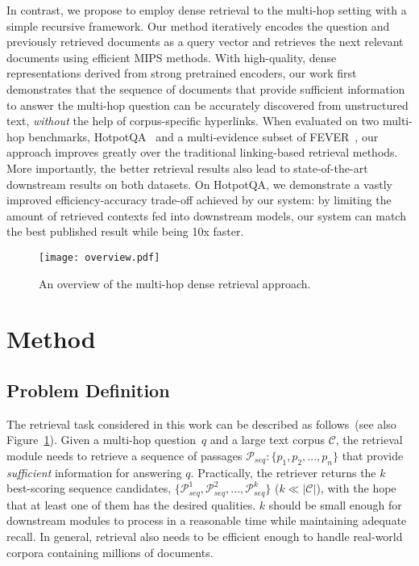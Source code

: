 In contrast, we propose to employ dense retrieval to the multi-hop setting with a simple recursive framework.
Our method iteratively encodes the question and previously retrieved documents as a query vector and retrieves the next relevant documents using efficient MIPS methods. 
With high-quality, dense representations derived from strong pretrained encoders, our work first demonstrates that the sequence of documents that provide sufficient information to answer the multi-hop question can be 
accurately discovered from unstructured text, \emph{without} the help of corpus-specific hyperlinks. 
When evaluated on two multi-hop benchmarks, HotpotQA~\citep{HotpotQA} and a multi-evidence subset of FEVER~\citep{FEVER}, our approach improves greatly over the traditional linking-based retrieval methods. %
More importantly, the better retrieval results also lead to state-of-the-art downstream results on both datasets. On HotpotQA, we demonstrate a vastly improved efficiency-accuracy trade-off achieved by our system: by limiting the amount of retrieved contexts fed into downstream models, our system can match the best published result while being 10x faster.

\begin{figure}[t]
\vspace{-0.2in}
\texttt{[image: overview.pdf]}
\vspace{-0.2in}
 \caption{An overview of the multi-hop dense retrieval approach.}
\vspace{-0.2in}
\label{fig:example}
\end{figure}

\section{Method}

\subsection{Problem Definition} 

The retrieval task considered in this work can be described as follows~(see also Figure~\ref{fig:example}). 
Given a multi-hop question~$q$ and a large text corpus $\mathcal{C}$, the retrieval module needs to retrieve a sequence of passages $\mathcal{P}_{seq} :\{p_1, p_2, ..., p_{n}\}$ that provide \emph{sufficient} information for answering $q$.  
Practically, the retriever returns the $k$ best-scoring sequence candidates, $\{\mathcal{P}_{seq}^1, \mathcal{P}_{seq}^2, ..., \mathcal{P}_{seq}^{k}\}$ ($k \ll |\mathcal{C}|$), with the hope that at least one of them has the desired qualities. 
$k$ should be small enough for downstream modules to process in a reasonable time while maintaining adequate recall.
In general, retrieval also needs to be efficient enough to handle real-world corpora containing millions of documents.

